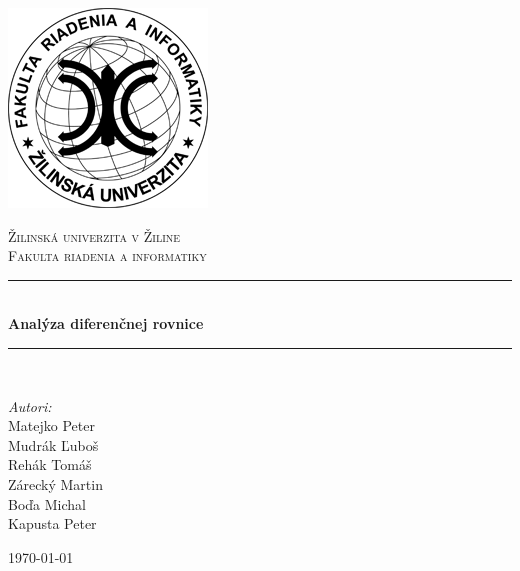 \documentclass[a4paper,10pt]{article}
\newcommand{\HRule}{\rule{\linewidth}{0.5mm}}
\theoremstyle{plain}
\theoremstyle{definition}
\begin{document}
\begin{titlepage}
\begin{center}

\includegraphics[scale=2,keepaspectratio=true]{./FRI_RGB_SK.png}

\textsc{\newline\LARGE Žilinská univerzita v Žiline}\\[0.5cm]

\textsc{\Large Fakulta riadenia a informatiky}\\[0.5cm]

\HRule \\[0.4cm]
{ \huge \bfseries Analýza diferenčnej rovnice \\[0.4cm] }

\HRule \\[1.5cm]

\begin{minipage}{0.4\textwidth}
\begin{flushleft} \large
\emph{Autori:}\\
Matejko Peter\\
Mudrák Ľuboš\\
Rehák Tomáš\\
Zárecký Martin\\
Boďa Michal\\
Kapusta Peter
\end{flushleft}
\end{minipage}
\begin{minipage}{0.4\textwidth}
\begin{flushright} 
\end{flushright}
\end{minipage}

\vfill

{\large \today}

\end{center}
\end{titlepage}
\end{document}
